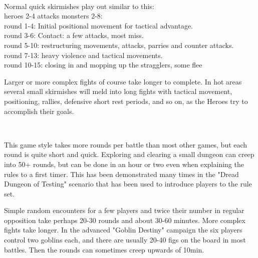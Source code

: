 \

Normal quick skirmishes play out similar to this: \\
heroes 2-4 attacks monsters 2-8: \\
round 1-4: Initial positional movement for tactical advantage. \\
round 3-6: Contact: a few attacks, most miss. \\
round 5-10: restructuring movements, attacks, parries and counter attacks. \\
round 7-13: heavy violence and tactical movements. \\
round 10-15: closing in and mopping up the stragglers, some flee

Larger or more complex fights of course take longer to complete. In hot areas several small skirmishes will meld into long fights with tactical movement, positioning, rallies, defensive short rest periods, and so on, as the Heroes try to accomplish their goals.

\

This game style takes more rounds per battle than most other games, but each round is quite short and quick. Exploring and clearing a small dungeon can creep into 50+ rounds, but can be done in an hour or two even when explaining the rules to a first timer. This has been demonstrated many times in the "Dread Dungeon of Testing" scenario that has been used to introduce players to the rule set.

Simple random encounters for a few players and twice their number in regular opposition take perhaps 20-30 rounds and about 30-60 minutes. More complex fights take longer. In the advanced "Goblin Destiny" campaign the six players control two goblins each, and there are usually 20-40 figs on the board in most battles. Then the rounds can sometimes creep upwards of 10min.



